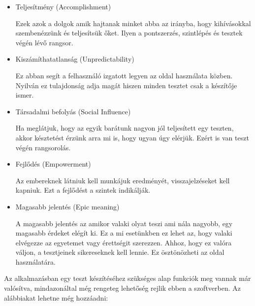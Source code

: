 \begin{itemize}
    \item {Teljesítmény (Accomplishment)}
          \begin{addmargin}[\parindent]{0pt}
              Ezek azok a dolgok amik hajtanak minket abba az irányba, hogy kihívásokkal szembenézzünk és teljesítsük őket. Ilyen a pontszerzés, szintlépés és tesztek végén lévő rangsor.
          \end{addmargin}
    \item {Kiszámíthatatlanság (Unpredictability)}
          \begin{addmargin}[\parindent]{0pt}
              Ez abban segít a felhasználó izgatott legyen az oldal használata közben. Nyilván ez tulajdonság adja magát hiszen minden tesztet csak a készítője ismer.
          \end{addmargin}
    \item {Társadalmi befolyás (Social Influence)}
          \begin{addmargin}[\parindent]{0pt}
              Ha meglátjuk, hogy az egyik barátunk nagyon jól teljesített egy teszten, akkor késztetést érzünk arra mi is, hogy ugyan úgy elérjük. Ezért is van teszt végén rangsorolás.
          \end{addmargin}
    \item {Fejlődés (Empowerment)}
          \begin{addmargin}[\parindent]{0pt}
            Az embereknek látniuk kell munkájuk eredményét, visszajelzéseket kell kapniuk. Ezt a fejlődést a szintek indikálják.
          \end{addmargin}
    \item {Magasabb jelentés (Epic meaning)}
          \begin{addmargin}[\parindent]{0pt}
              A magasabb jelentés az amikor valaki olyat teszi ami nála nagyobb, egy magasabb érdeket elégít ki. Ez a mi esetünkben ez lehet az, hogy valaki elvégezze az egyetemet vagy érettségit szerezzen. Ahhoz, hogy ez valóra váljon, a tesztjeinek sikereseknek kell lennie. Ez ösztönözheti az oldal használatára.
          \end{addmargin}
\end{itemize}


Az alkalmazásban egy teszt készítéséhez szükséges alap funkciók meg vannak már valósítva, mindazonáltal még rengeteg lehetőség rejlik ebben a szoftverben. Az alábbiakat lehetne még hozzáadni:

